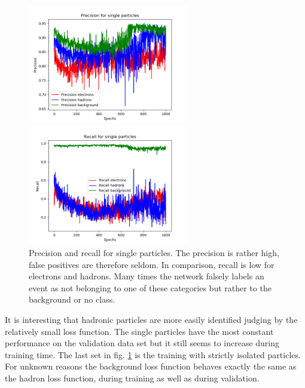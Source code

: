 \begin{figure}
\centering
\begin{minipage}{0.45\textwidth}
\includegraphics[width=7cm]{precisionsingle.png}
\end{minipage}
\begin{minipage}{0.45\textwidth}
\includegraphics[width=7cm]{recallsingle.png}
\end{minipage}
\caption{Precision and recall for single particles. The precision is rather high, false positives are therefore seldom. In comparison, recall is low for electrons and hadrons. Many times the network falsely labels an event as not belonging to one of these categories but rather to the background or no class.}
\label{lossall}
\end{figure}
It is interesting that hadronic particles are more easily identified judging by the relatively small loss function. The single particles have the most constant performance on the validation data set but it still seems to increase during training time. The last set in fig. \ref{lossall} is the training with strictly isolated particles. For unknown reasons the background loss function behaves exactly the same as the hadron loss function, during training as well as during validation. 
